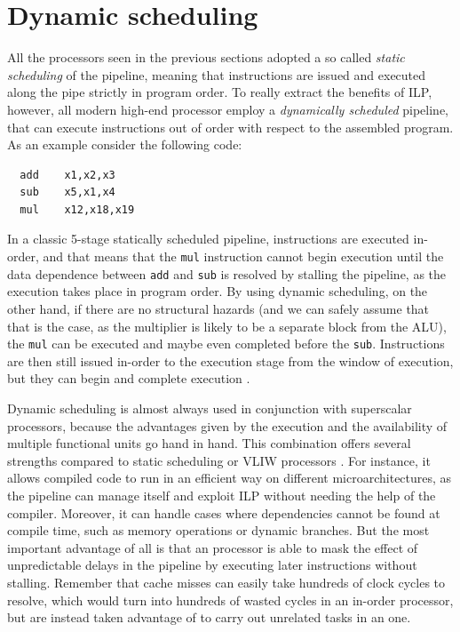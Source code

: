 \section{Dynamic scheduling}
All the processors seen in the previous sections adopted a so called \emph{static scheduling} of the pipeline, meaning that instructions are issued and executed along the pipe strictly in program order. To really extract the benefits of \ac{ILP}, however, all modern high-end processor employ a \emph{dynamically scheduled} pipeline, that can execute instructions out of order with respect to the assembled program. As an example consider the following code:
\begin{verbatim}
  add    x1,x2,x3
  sub    x5,x1,x4
  mul    x12,x18,x19
\end{verbatim}
In a classic 5-stage statically scheduled pipeline, instructions are executed in-order, and that means that the \texttt{mul} instruction cannot begin execution until the data dependence between \texttt{add} and \texttt{sub} is resolved by stalling the pipeline, as the execution takes place in program order. By using dynamic scheduling, on the other hand, if there are no structural hazards (and we can safely assume that that is the case, as the multiplier is likely to be a separate block from the ALU), the \texttt{mul} can be executed and maybe even completed before the \texttt{sub}. Instructions are then still issued in-order to the execution stage from the window of execution, but they can begin and complete execution \ooo.

Dynamic scheduling is almost always used in conjunction with superscalar processors, because the advantages given by the \ooo execution and the availability of multiple functional units go hand in hand. This combination offers several strengths compared to static scheduling or VLIW processors \cite[p.~192]{hennessy17}. For instance, it allows compiled code to run in an efficient way on different microarchitectures, as the pipeline can manage itself and exploit \ac{ILP} without needing the help of the compiler. Moreover, it can handle cases where dependencies cannot be found at compile time, such as memory operations or dynamic branches. But the most important advantage of all is that an \ooo processor is able to mask the effect of unpredictable delays in the pipeline by executing later instructions without stalling. Remember that cache misses can easily take hundreds of clock cycles to resolve, which would turn into hundreds of wasted cycles in an in-order processor, but are instead taken advantage of to carry out unrelated tasks in an \ooo one.

